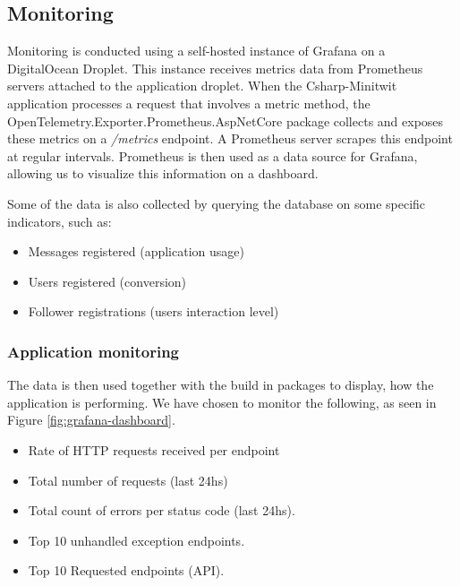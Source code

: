 
\subsection{Monitoring}
Monitoring is conducted using a self-hosted instance of Grafana on a DigitalOcean Droplet. This instance receives metrics data from Prometheus servers attached to the application droplet. When the Csharp-Minitwit application processes a request that involves a metric method, the OpenTelemetry.Exporter.Prometheus.AspNetCore package collects and exposes these metrics on a \textit{/metrics} endpoint. A Prometheus server scrapes this endpoint at regular intervals. Prometheus is then used as a data source for Grafana, allowing us to visualize this information on a dashboard.\newline

\noindent Some of the data is also collected by querying the database on some specific indicators, such as:
\begin{itemize}
    \item Messages registered (application usage)
    \item Users registered (conversion)
    \item Follower registrations (users interaction level)
\end{itemize}

\subsubsection{Application monitoring}
The data is then used together with the build in packages to display, how the application is performing. We have chosen to monitor the following, as seen in Figure \ref{fig:grafana-dashboard}.
\begin{itemize}
    \item Rate of HTTP requests received per endpoint
    \item Total number of requests (last 24hs)
    \item Total count of errors per status code (last 24hs).
    \item Top 10 unhandled exception endpoints.
    \item Top 10 Requested endpoints (API).
\end{itemize}

